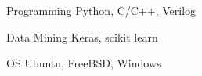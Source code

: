

\begin{cvskills}

  \cvskill
    {Programming} %
    {Python, C/C++, Verilog} %

  \cvskill
    {Data Mining} %
    {Keras, scikit learn} %

  \cvskill
    {OS} %
    {Ubuntu, FreeBSD, Windows} %

\end{cvskills}
